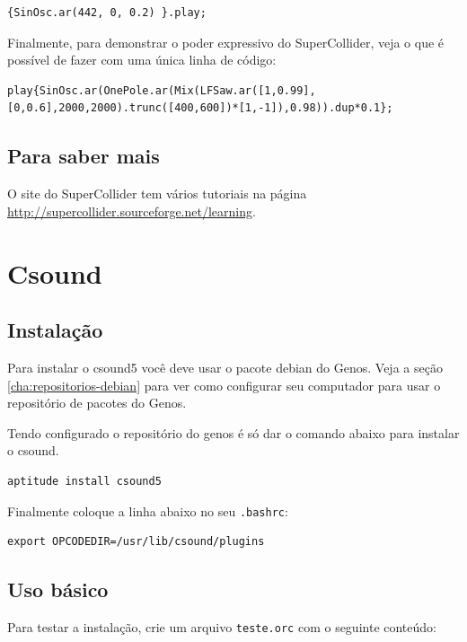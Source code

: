 \documentclass[12pt,brazil]{book}
\begin{document}
\begin{verbatim}
{SinOsc.ar(442, 0, 0.2) }.play;
\end{verbatim}

Finalmente, para demonstrar o poder expressivo do SuperCollider, veja
o que é possível de fazer com uma única linha de código:

\begin{verbatim}
play{SinOsc.ar(OnePole.ar(Mix(LFSaw.ar([1,0.99],[0,0.6],2000,2000).trunc([400,600])*[1,-1]),0.98)).dup*0.1};
\end{verbatim}

\section{Para saber mais}
\label{sec:para-saber-mais-1}

O site do SuperCollider tem vários tutoriais na página
\url{http://supercollider.sourceforge.net/learning}.

\chapter{Csound}
\label{cha:csound}

\section{Instalação}
\label{sec:instalacao-4}

Para instalar o csound5 você deve usar o pacote debian do Genos. Veja
a seção \ref{cha:repositorios-debian} para ver como configurar seu
computador para usar o repositório de pacotes do Genos.

Tendo configurado o repositório do genos é só dar o comando abaixo
para instalar o csound.

\begin{verbatim}
aptitude install csound5
\end{verbatim}

Finalmente coloque a linha abaixo no seu \texttt{.bashrc}:

\begin{verbatim}
export OPCODEDIR=/usr/lib/csound/plugins
\end{verbatim}

\section{Uso básico}
\label{sec:uso-basico-2}

Para testar a instalação, crie um arquivo \texttt{teste.orc} com o seguinte
conteúdo:
\end{document}
